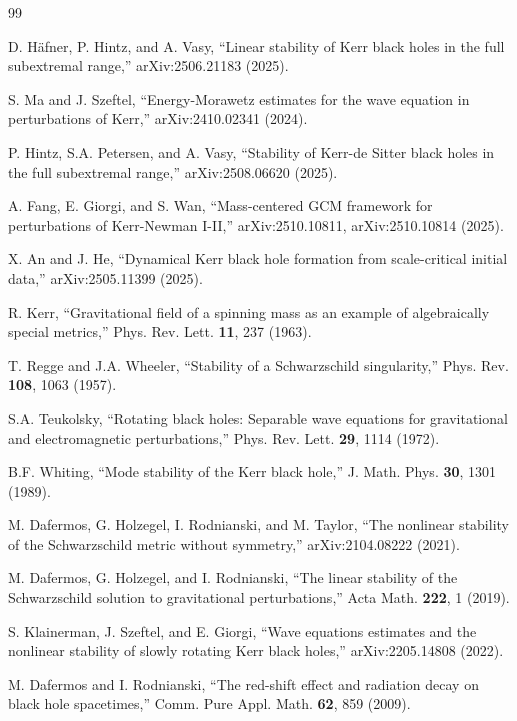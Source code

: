 \documentclass[12pt,a4paper]{article}
\begin{document}
\begin{thebibliography}{99}

D. Häfner, P. Hintz, and A. Vasy, ``Linear stability of Kerr black holes in the full subextremal range,'' arXiv:2506.21183 (2025).

S. Ma and J. Szeftel, ``Energy-Morawetz estimates for the wave equation in perturbations of Kerr,'' arXiv:2410.02341 (2024).

P. Hintz, S.A. Petersen, and A. Vasy, ``Stability of Kerr-de Sitter black holes in the full subextremal range,'' arXiv:2508.06620 (2025).

A. Fang, E. Giorgi, and S. Wan, ``Mass-centered GCM framework for perturbations of Kerr-Newman I-II,'' arXiv:2510.10811, arXiv:2510.10814 (2025).

X. An and J. He, ``Dynamical Kerr black hole formation from scale-critical initial data,'' arXiv:2505.11399 (2025).

R. Kerr, ``Gravitational field of a spinning mass as an example of algebraically special metrics,'' Phys. Rev. Lett. \textbf{11}, 237 (1963).

T. Regge and J.A. Wheeler, ``Stability of a Schwarzschild singularity,'' Phys. Rev. \textbf{108}, 1063 (1957).

S.A. Teukolsky, ``Rotating black holes: Separable wave equations for gravitational and electromagnetic perturbations,'' Phys. Rev. Lett. \textbf{29}, 1114 (1972).

B.F. Whiting, ``Mode stability of the Kerr black hole,'' J. Math. Phys. \textbf{30}, 1301 (1989).

M. Dafermos, G. Holzegel, I. Rodnianski, and M. Taylor, ``The nonlinear stability of the Schwarzschild metric without symmetry,'' arXiv:2104.08222 (2021).

M. Dafermos, G. Holzegel, and I. Rodnianski, ``The linear stability of the Schwarzschild solution to gravitational perturbations,'' Acta Math. \textbf{222}, 1 (2019).

S. Klainerman, J. Szeftel, and E. Giorgi, ``Wave equations estimates and the nonlinear stability of slowly rotating Kerr black holes,'' arXiv:2205.14808 (2022).

M. Dafermos and I. Rodnianski, ``The red-shift effect and radiation decay on black hole spacetimes,'' Comm. Pure Appl. Math. \textbf{62}, 859 (2009).


\end{thebibliography}
\end{document}
